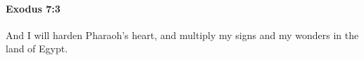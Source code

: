 
		\paragraph{Exodus 7:3} %
			\label{EXODUS-7-3}

			And I will harden Pharaoh's heart, and multiply my signs and my wonders in the land of Egypt.


